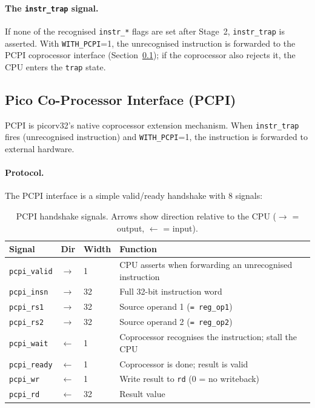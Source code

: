 \documentclass[9pt, a4paper]{extarticle}
\begin{document}
\paragraph{The \texttt{instr\_trap} signal.} If none of the recognised \texttt{instr\_*} flags are set after Stage~2, \texttt{instr\_trap} is asserted. With \texttt{WITH\_PCPI}=1, the unrecognised instruction is forwarded to the PCPI coprocessor interface (Section~\ref{sec:pcpi}); if the coprocessor also rejects it, the CPU enters the \texttt{trap} state.

\newpage
\subsection{Pico Co-Processor Interface (PCPI)}
\label{sec:pcpi}

PCPI is picorv32's native coprocessor extension mechanism. When \texttt{instr\_trap} fires (unrecognised instruction) and \texttt{WITH\_PCPI}=1, the instruction is forwarded to external hardware.

\paragraph{Protocol.} The PCPI interface is a simple valid/ready handshake with 8 signals:

\begin{table}[htbp]
\centering\small
\begin{tabular}{@{}l l l p{8.0cm}@{}}
    \toprule
    Signal & Dir & Width & Function \\
    \midrule
    \texttt{pcpi\_valid} & $\to$ & 1 & CPU asserts when forwarding an unrecognised instruction \\
    \texttt{pcpi\_insn} & $\to$ & 32 & Full 32-bit instruction word \\
    \texttt{pcpi\_rs1} & $\to$ & 32 & Source operand 1 (\texttt{= reg\_op1}) \\
    \texttt{pcpi\_rs2} & $\to$ & 32 & Source operand 2 (\texttt{= reg\_op2}) \\
    \texttt{pcpi\_wait} & $\leftarrow$ & 1 & Coprocessor recognises the instruction; stall the CPU \\
    \texttt{pcpi\_ready} & $\leftarrow$ & 1 & Coprocessor is done; result is valid \\
    \texttt{pcpi\_wr} & $\leftarrow$ & 1 & Write result to \texttt{rd} (0 = no writeback) \\
    \texttt{pcpi\_rd} & $\leftarrow$ & 32 & Result value \\
    \bottomrule
\end{tabular}
\caption{PCPI handshake signals. Arrows show direction relative to the CPU ($\to$ = output, $\leftarrow$ = input).}
\label{tab:pcpi-signals}
\end{table}
\end{document}
